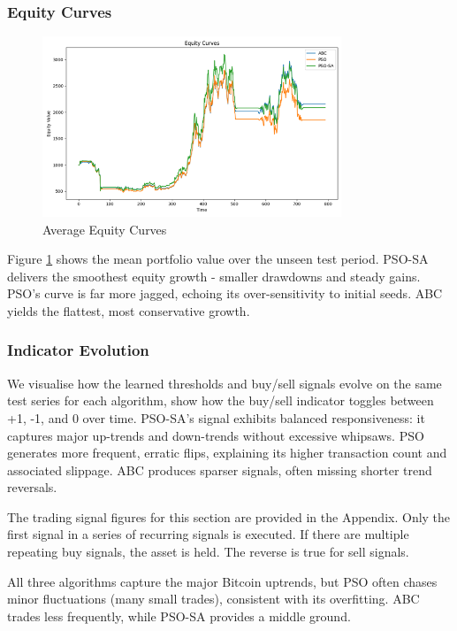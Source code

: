 \documentclass[a4paper, 12pt]{extarticle}
\begin{document}
\subsubsection{Equity Curves}
\begin{figure}[h!]
    \centering
    \includegraphics[width=0.8\textwidth]{./assets/equity.png}
    \caption{Average Equity Curves}
    \label{fig:equity}
\end{figure}
Figure \ref{fig:equity} shows the mean portfolio value over the unseen test period. PSO-SA delivers the smoothest equity growth - smaller drawdowns and steady gains. PSO's curve is far more jagged, echoing its over-sensitivity to initial seeds. ABC yields the flattest, most conservative growth. 

\newpage
\subsubsection{Indicator Evolution}

We visualise how the learned thresholds and buy/sell signals evolve on the same test series for each algorithm, show how the buy/sell indicator toggles between +1, -1, and 0 over time. PSO-SA's signal exhibits balanced responsiveness: it captures major up-trends and down-trends without excessive whipsaws. PSO generates more frequent, erratic flips, explaining its higher transaction count and associated slippage. ABC produces sparser signals, often missing shorter trend reversals. 

The trading signal figures for this section are provided in the Appendix. Only the first signal in a series of recurring signals is executed. If there are multiple repeating buy signals, the asset is held. The reverse is true for sell signals.

All three algorithms capture the major Bitcoin uptrends, but PSO often chases minor fluctuations (many small trades), consistent with its overfitting. ABC trades less frequently, while PSO-SA provides a middle ground. 
\end{document}
